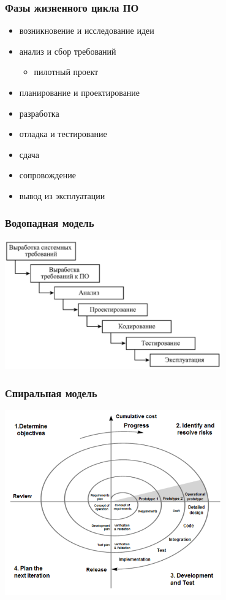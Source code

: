 \documentclass{../../slides-style}
\begin{document}
    \begin{frame}
        \frametitle{Фазы жизненного цикла ПО}
        \begin{itemize}
            \item возникновение и исследование идеи
            \item анализ и сбор требований
            \begin{itemize}
                \item пилотный проект
            \end{itemize}
            \item планирование и проектирование
            \item разработка
            \item отладка и тестирование
            \item сдача
            \item сопровождение
            \item вывод из эксплуатации
        \end{itemize}
    \end{frame}

    \begin{frame}
        \frametitle{Водопадная модель}
        \begin{center}
            \includegraphics[width=0.7\textwidth]{waterfall-model.png}
        \end{center}
    \end{frame}

    \begin{frame}
        \frametitle{Спиральная модель}
        \begin{center}
            \includegraphics[width=0.7\textwidth]{spiral-model.png}
        \end{center}
    \end{frame}
\end{document}
